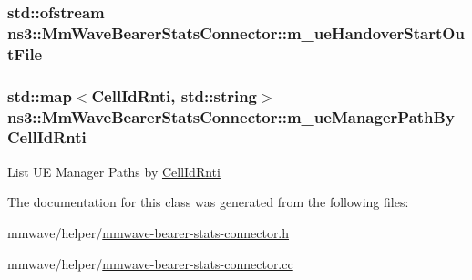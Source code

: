 \subsubsection[{\texorpdfstring{m\+\_\+ue\+Handover\+Start\+Out\+File}{m_ueHandoverStartOutFile}}]{\setlength{\rightskip}{0pt plus 5cm}std\+::ofstream ns3\+::\+Mm\+Wave\+Bearer\+Stats\+Connector\+::m\+\_\+ue\+Handover\+Start\+Out\+File\hspace{0.3cm}{\ttfamily [private]}}\hypertarget{classns3_1_1MmWaveBearerStatsConnector_a43b081d16c706f202bde185dba54e4e2}{}\label{classns3_1_1MmWaveBearerStatsConnector_a43b081d16c706f202bde185dba54e4e2}
\subsubsection[{\texorpdfstring{m\+\_\+ue\+Manager\+Path\+By\+Cell\+Id\+Rnti}{m_ueManagerPathByCellIdRnti}}]{\setlength{\rightskip}{0pt plus 5cm}std\+::map$<${\bf Cell\+Id\+Rnti}, std\+::string$>$ ns3\+::\+Mm\+Wave\+Bearer\+Stats\+Connector\+::m\+\_\+ue\+Manager\+Path\+By\+Cell\+Id\+Rnti\hspace{0.3cm}{\ttfamily [private]}}\hypertarget{classns3_1_1MmWaveBearerStatsConnector_a2e594f10e75a9fadbb3519a1dfc38081}{}\label{classns3_1_1MmWaveBearerStatsConnector_a2e594f10e75a9fadbb3519a1dfc38081}
List UE Manager Paths by \hyperlink{structns3_1_1MmWaveBearerStatsConnector_1_1CellIdRnti}{Cell\+Id\+Rnti} 

The documentation for this class was generated from the following files\+:\begin{DoxyCompactItemize}
\item 
mmwave/helper/\hyperlink{mmwave-bearer-stats-connector_8h}{mmwave-\/bearer-\/stats-\/connector.\+h}\item 
mmwave/helper/\hyperlink{mmwave-bearer-stats-connector_8cc}{mmwave-\/bearer-\/stats-\/connector.\+cc}\end{DoxyCompactItemize}
